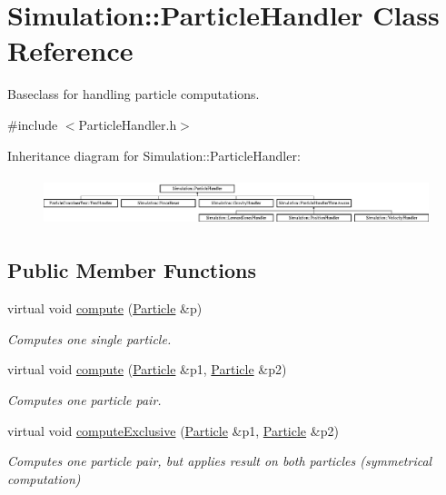 \hypertarget{classSimulation_1_1ParticleHandler}{\section{Simulation\-:\-:Particle\-Handler Class Reference}
\label{classSimulation_1_1ParticleHandler}
}


Baseclass for handling particle computations.  




{\ttfamily \#include $<$Particle\-Handler.\-h$>$}

Inheritance diagram for Simulation\-:\-:Particle\-Handler\-:\begin{figure}[H]
\begin{center}
\leavevmode
\includegraphics[height=1.435897cm]{classSimulation_1_1ParticleHandler}
\end{center}
\end{figure}
\subsection*{Public Member Functions}
\begin{DoxyCompactItemize}
\item 
virtual void \hyperlink{classSimulation_1_1ParticleHandler_a6b1fc310603bc10093d50c674097fd25}{compute} (\hyperlink{classSimulation_1_1Particle}{Particle} \&p)
\begin{DoxyCompactList}\small\item\em Computes one single particle. \end{DoxyCompactList}\item 
virtual void \hyperlink{classSimulation_1_1ParticleHandler_a013ad557c6892ed2287db090192144ea}{compute} (\hyperlink{classSimulation_1_1Particle}{Particle} \&p1, \hyperlink{classSimulation_1_1Particle}{Particle} \&p2)
\begin{DoxyCompactList}\small\item\em Computes one particle pair. \end{DoxyCompactList}\item 
virtual void \hyperlink{classSimulation_1_1ParticleHandler_a4a1caeb40ada4f410fec9244bda4af69}{compute\-Exclusive} (\hyperlink{classSimulation_1_1Particle}{Particle} \&p1, \hyperlink{classSimulation_1_1Particle}{Particle} \&p2)
\begin{DoxyCompactList}\small\item\em Computes one particle pair, but applies result on both particles (symmetrical computation) \end{DoxyCompactList}\end{DoxyCompactItemize}


